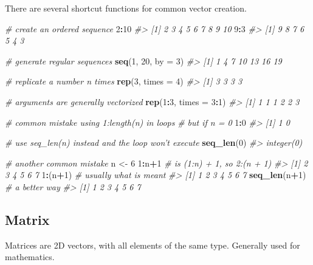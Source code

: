 \documentclass[]{book}
\newenvironment{Shaded}{\begin{snugshade}}{\end{snugshade}}
\newcommand{\KeywordTok}[1]{\textcolor[rgb]{0.13,0.29,0.53}{\textbf{#1}}}
\newcommand{\DataTypeTok}[1]{\textcolor[rgb]{0.13,0.29,0.53}{#1}}
\newcommand{\DecValTok}[1]{\textcolor[rgb]{0.00,0.00,0.81}{#1}}
\newcommand{\StringTok}[1]{\textcolor[rgb]{0.31,0.60,0.02}{#1}}
\newcommand{\CommentTok}[1]{\textcolor[rgb]{0.56,0.35,0.01}{\textit{#1}}}
\newcommand{\OperatorTok}[1]{\textcolor[rgb]{0.81,0.36,0.00}{\textbf{#1}}}
\newcommand{\NormalTok}[1]{#1}
\theoremstyle{definition}
\theoremstyle{definition}
\theoremstyle{definition}
\theoremstyle{remark}
\begin{document}
There are several shortcut functions for common vector creation.

\begin{Shaded}
\begin{Highlighting}[]
\CommentTok{# create an ordered sequence}
\DecValTok{2}\OperatorTok{:}\DecValTok{10}
\CommentTok{#> [1]  2  3  4  5  6  7  8  9 10}
\DecValTok{9}\OperatorTok{:}\DecValTok{3}
\CommentTok{#> [1] 9 8 7 6 5 4 3}

\CommentTok{# generate regular sequences}
\KeywordTok{seq}\NormalTok{(}\DecValTok{1}\NormalTok{, }\DecValTok{20}\NormalTok{, }\DataTypeTok{by =} \DecValTok{3}\NormalTok{)}
\CommentTok{#> [1]  1  4  7 10 13 16 19}

\CommentTok{# replicate a number n times}
\KeywordTok{rep}\NormalTok{(}\DecValTok{3}\NormalTok{, }\DataTypeTok{times =} \DecValTok{4}\NormalTok{)}
\CommentTok{#> [1] 3 3 3 3}

\CommentTok{# arguments are generally vectorized}
\KeywordTok{rep}\NormalTok{(}\DecValTok{1}\OperatorTok{:}\DecValTok{3}\NormalTok{, }\DataTypeTok{times =} \DecValTok{3}\OperatorTok{:}\DecValTok{1}\NormalTok{)}
\CommentTok{#> [1] 1 1 1 2 2 3}

\CommentTok{# common mistake using 1:length(n) in loops}
\CommentTok{# but if n = 0}
\DecValTok{1}\OperatorTok{:}\DecValTok{0}
\CommentTok{#> [1] 1 0}

\CommentTok{# use seq_len(n) instead and the loop won't execute}
\KeywordTok{seq_len}\NormalTok{(}\DecValTok{0}\NormalTok{)}
\CommentTok{#> integer(0)}

\CommentTok{# another common mistake}
\NormalTok{n <-}\StringTok{ }\DecValTok{6}
\DecValTok{1}\OperatorTok{:}\NormalTok{n}\OperatorTok{+}\DecValTok{1}        \CommentTok{# is (1:n) + 1, so 2:(n + 1)}
\CommentTok{#> [1] 2 3 4 5 6 7}
\DecValTok{1}\OperatorTok{:}\NormalTok{(n}\OperatorTok{+}\DecValTok{1}\NormalTok{)      }\CommentTok{# usually what is meant}
\CommentTok{#> [1] 1 2 3 4 5 6 7}
\KeywordTok{seq_len}\NormalTok{(n}\OperatorTok{+}\DecValTok{1}\NormalTok{) }\CommentTok{# a better way}
\CommentTok{#> [1] 1 2 3 4 5 6 7}
\end{Highlighting}
\end{Shaded}

\subsection{Matrix}\label{matrix}

Matrices are 2D vectors, with all elements of the same type. Generally
used for mathematics.
\end{document}
